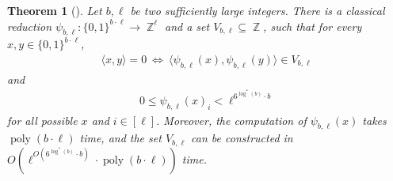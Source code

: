 \documentclass[10pt,a4paper]{article}
\newtheorem{theorem}{Theorem}
\newcommand{\ip}[2]{\langle {#1} , {#2} \rangle}
\DeclareMathOperator*{\Z}{\mathbb{Z}}
\DeclareMathOperator{\poly}{poly}
\begin{document}
\begin{theorem}[{\cite[Theorem 4.1]{r17}}]\label{thm:zov_map}
Let $b,\ell$ be two sufficiently large integers. There is a classical reduction $\psi_{b,\ell}:\{0,1\}^{b\cdot\ell}\rightarrow \Z^\ell$ and a set $V_{b,\ell}\subseteq \Z$, such that for every $x,y\in \{0,1\}^{b\cdot \ell}$,
\begin{align}\label{eq:zov_iff}
    \ip{x}{y}=0~\Leftrightarrow~\ip{\psi_{b,\ell}(x)}{\psi_{b,\ell}(y)}\in V_{b,\ell}
\end{align}
and
\begin{align}
    0\leq \psi_{b,\ell}(x)_i< \ell^{6^{\log^* (b)}\cdot b}
\end{align}
for all possible $x$ and $i\in [\ell]$. Moreover, the computation of $\psi_{b,\ell}(x)$ takes $\poly(b\cdot \ell)$ time, and the set $V_{b,\ell}$ can be constructed in $O\left( \ell^{O(6^{\log^* (b)}\cdot b)}\cdot \poly(b\cdot \ell) \right)$ time.
\end{theorem}
\end{document}
